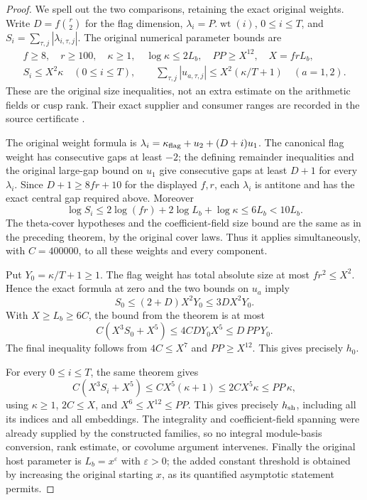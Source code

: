 \begin{proof}
We spell out the two comparisons, retaining the exact original
weights.  Write $D=f\binom r2$ for the flag dimension,
$\lambda_i=P.\operatorname{wt}(i)$, $0\le i\le T$, and
$S_i=\sum_{\tau,j}|\lambda_{i,\tau,j}|$.
The original numerical parameter bounds are
\[
 \begin{gathered}
 f\ge8,\quad r\ge100,\quad \kappa\ge1,\quad
 \log\kappa\le2L_b,\quad PP\ge X^{12},\quad X=frL_b,\\
 S_i\le X^2\kappa\quad(0\le i\le T),\qquad
 \sum_{\tau,j}|u_{a,\tau,j}|\le
         X^2(\kappa/T+1)\quad(a=1,2).
 \end{gathered}
\]
These are the original size inequalities, not an extra estimate
on the arithmetic fields or cusp rank.  Their exact supplier and
consumer ranges are recorded in the source certificate
\cite{theta-key-source}.

The original weight formula is
$\lambda_i=\kappa_{\rm flag}+u_2+(D+i)u_1$.
The canonical flag weight has consecutive gaps at least $-2$;
the defining remainder inequalities and the original large-gap
bound on $u_1$ give consecutive gaps at least $D+1$ for every
$\lambda_i$.  Since
$D+1\ge8fr+10$ for the displayed $f,r$, each $\lambda_i$ is
antitone and has the exact central gap required above.  Moreover
\[
 \log S_i\le2\log(fr)+2\log L_b+\log\kappa\le6L_b<10L_b.
\]
The theta-cover hypotheses and the coefficient-field size bound
are the same as in the preceding theorem, by the original cover
laws.  Thus it applies simultaneously, with $C=400000$, to all
these weights and every component.

Put $Y_0=\kappa/T+1\ge1$.  The flag weight has total absolute
size at most $fr^2\le X^2$.  Hence the exact formula at zero and
the two bounds on $u_a$ imply
\[
             S_0\le(2+D)X^2Y_0\le3DX^2Y_0.
\]
With $X\ge L_b\ge6C$, the bound from the theorem is at most
\[
 C(X^3S_0+X^5)
       \le4CDY_0X^5\le D\,PP\,Y_0.
\]
The final inequality follows from $4C\le X^7$ and $PP\ge X^{12}$.
This gives precisely $h_0$.

For every $0\le i\le T$, the same theorem gives
\[
 C(X^3S_i+X^5)
       \le CX^5(\kappa+1)
       \le2CX^5\kappa\le PP\,\kappa,
\]
using $\kappa\ge1$, $2C\le X$, and $X^6\le X^{12}\le PP$.
This gives precisely $h_{\rm sh}$, including all its indices and
all embeddings.  The integrality and coefficient-field spanning
were already supplied by the constructed families, so no
integral module-basis conversion, rank estimate, or covolume
argument intervenes.  Finally the original host parameter is
$L_b=x^\varepsilon$ with $\varepsilon>0$; the added constant
threshold is obtained by increasing the original starting $x$,
as its quantified asymptotic statement permits.
\end{proof}
